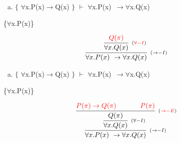 \documentclass[aspectratio=43]{beamer}
\newcommand{\ria}{$\rightarrow$}
\newcommand{\fall}{$\forall$}
\begin{document}
    \begin{frame}[fragile]
    
    	\begin{enumerate}[f)]
			\item $\{$ \fall x.P(x)\ria Q(x) $\}$ $\vdash$ \fall x.P(x)\ \ria \fall x.Q(x) \\
		\end{enumerate}
        \{\fall x.P(x)\}
        \vspace{55pt}
        
        \[
        \begin{array}{c}
		
        	\infer[_{(\to -I)}]
            	{\forall x.P(x)\ \to \forall x.Q(x)}
            	{\infer[_{(\textcolor{red}{\forall -I})}] 
                	{\forall x.Q(x)}
                    {\textcolor{red}{Q(\pi)}}
                 }   
        
		\end{array}
        \]
        
	\end{frame}
    
    \begin{frame}[fragile]
    
    	\begin{enumerate}[f)]
			\item $\{$ \fall x.P(x)\ria Q(x) $\}$ $\vdash$ \fall x.P(x)\ \ria \fall x.Q(x) \\
		\end{enumerate}
        \{\fall x.P(x)\}
        \vspace{50pt}
        
        \[
        \begin{array}{c}
		
        	\infer[_{(\to -I)}]
            	{\forall x.P(x)\ \to \forall x.Q(x)}
            	{\infer[_{(\forall -I)}] 
                	{\forall x.Q(x)}
                    {\infer[_{(\textcolor{red}{\to -E})}]
                    	{Q(\pi)}
                        {\textcolor{red}{P(\pi)\rightarrow Q(\pi) \hspace{35pt} P(\pi)}}
                    }
                 }   
        
		\end{array}
        \]
        
	\end{frame}
    
\end{document}
